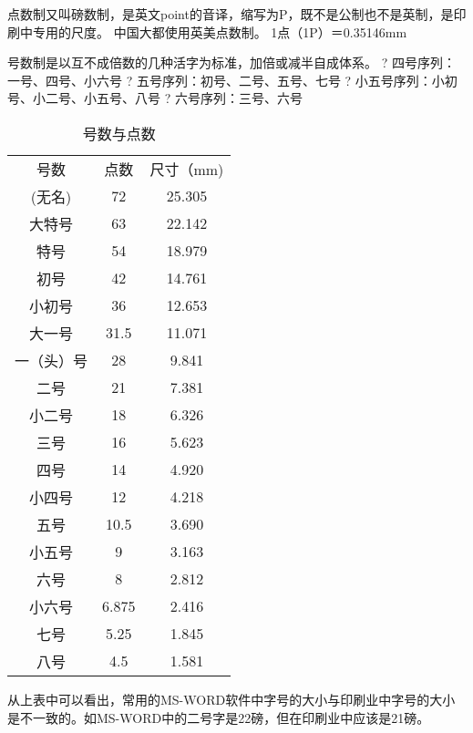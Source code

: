 点数制又叫磅数制，是英文point的音译，缩写为P，既不是公制也不是英制，是印刷中专用的尺度。
中国大都使用英美点数制。
1点（1P）＝0.35146mm

号数制是以互不成倍数的几种活字为标准，加倍或减半自成体系。
? 四号序列：一号、四号、小六号
? 五号序列：初号、二号、五号、七号
? 小五号序列：小初号、小二号、小五号、八号
? 六号序列：三号、六号

\begin{table}
	\centering
	\begin{tabular}{ccc}

号数&            点数&                 尺寸（mm)\\
(无名)&          72&                 25.305\\
大特号&          63&                 22.142\\
特号&            54&                 18.979\\
初号&            42&                 14.761\\
小初号&          36&                 12.653\\
大一号&          31.5&                 11.071\\
一（头）号&      28&                 9.841\\
二号&            21&                 7.381\\
小二号&          18&                 6.326\\
三号&            16&                 5.623\\
四号&            14&                 4.920\\
小四号&          12&                 4.218\\
五号&            10.5&                 3.690\\
小五号&          9&                 3.163\\
六号&            8&                 2.812\\
小六号&          6.875&                 2.416\\
七号&            5.25&                 1.845\\
八号&            4.5&                 1.581\\
	\end{tabular}
	\caption{号数与点数}
\end{table}

从上表中可以看出，常用的MS-WORD软件中字号的大小与印刷业中字号的大小是不一致的。如MS-WORD中的二号字是22磅，但在印刷业中应该是21磅。







